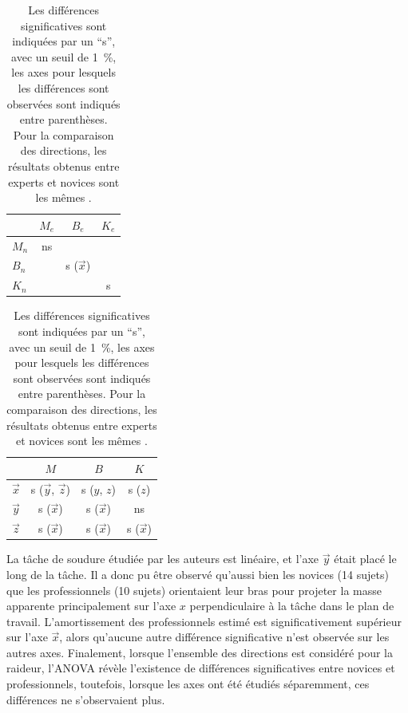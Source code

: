 \begin{table}
	\parbox{.45\linewidth}{
		\caption[Résultats de l'expérience de \textcite{erden_hand_2015} pour l'expertise]{Expertise} \label{tab_erden_anova1}
		\centering
		\begin{tabular}{| l | c  c  c | } 
			\hline
		 & $M_e$ & $B_e$ & $K_e$ \\ \hline
			$M_n$ & ns & & \\ \hline
			$B_n$ & & s ($\vec{x}$) & \\ \hline
			$K_n$ & & & s \\ 
			\hline
		\end{tabular} %
	}
	\hfill	
	\parbox{.45\linewidth}{
		\caption[Résultats de l'expérience de \textcite{erden_hand_2015} pour la direction]{Direction} \label{tab_erden_anova2}
		\centering
		\begin{tabular}{| l | c  c  c | } 
			\hline
			& $M$ & $B$ & $K$ \\ \hline
			$\vec{x}$ & s ($\vec{y}$, $\vec{z}$) & s ($y$, $z$) & s ($z$)\\ \hline
			$\vec{y}$ & s ($\vec{x}$) & s ($\vec{x}$) & ns  \\ \hline
			$\vec{z}$ & s ($\vec{x}$) & s ($\vec{x}$) & s ($\vec{x}$)\\ 
			\hline
		\end{tabular} %
	}
\caption*{\footnotesize Les différences significatives sont indiquées par un \foreignquote{french}{s}, avec un seuil de \SI{1}{\percent}, les axes pour lesquels les différences sont observées sont indiqués entre parenthèses. Pour la comparaison des directions, les résultats obtenus entre experts et novices sont les mêmes \parencite{erden_hand_2015}.}
\end{table}

La tâche de soudure étudiée par les auteurs est linéaire, et l'axe $\vec{y}$ était placé le long de la tâche. Il a donc pu être observé qu'aussi bien les novices (14 sujets) que les professionnels (10 sujets) orientaient leur bras pour projeter la masse apparente principalement sur l'axe $x$ perpendiculaire à la tâche dans le plan de travail. L'amortissement des professionnels estimé est significativement supérieur sur l'axe $\vec{x}$, alors qu'aucune autre différence significative n'est observée sur les autres axes. Finalement, lorsque l'ensemble des directions est considéré pour la raideur, l'ANOVA révèle l'existence de différences significatives entre novices et professionnels, toutefois, lorsque les axes ont été étudiés séparemment, ces différences ne s'observaient plus.

